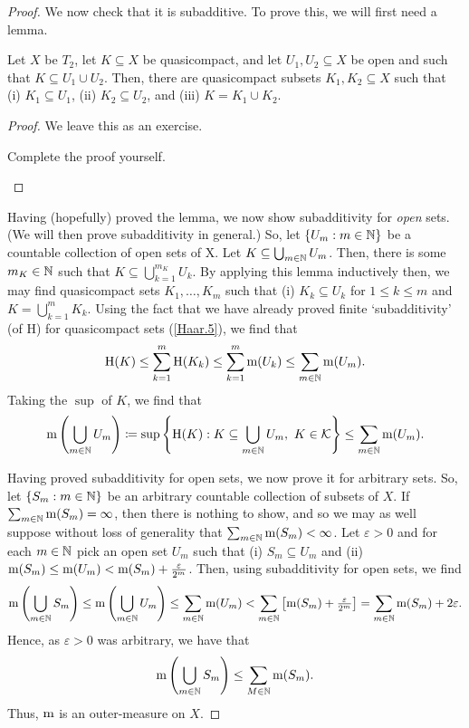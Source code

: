 \begin{thm}
\begin{savenotes}
\begin{proof}
We now check that it is subadditive.  To prove this, we will first need a lemma.
\begin{lma}
Let $X$ be $T_2$, let $K\subseteq X$ be quasicompact, and let $U_1,U_2\subseteq X$ be open and such that $K\subseteq U_1\cup U_2$.  Then, there are quasicompact subsets $K_1,K_2\subseteq X$ such that (i) $K_1\subseteq U_1$, (ii) $K_2\subseteq U_2$, and (iii) $K=K_1\cup K_2$.
\begin{proof}
We leave this as an exercise.
\begin{exr}
Complete the proof yourself.
\end{exr}
\end{proof}
\end{lma}
Having (hopefully) proved the lemma, we now show subadditivity for \emph{open} sets.  (We will then prove subadditivity in general.)  So, let $\{ U_m:m\in \mathbb{N} \}$ be a countable collection of open sets of X.  Let $K\subseteq \bigcup _{m\in \mathbb{N}}U_m$.  Then, there is some $m_K\in \mathbb{N}$ such that $K\subseteq \bigcup _{k=1}^{m_K}U_k$.  By applying this lemma inductively then, we may find quasicompact sets $K_1,\ldots ,K_m$ such that (i) $K_k\subseteq U_k$ for $1\leq k\leq m$ and $K=\bigcup _{k=1}^mK_k$.  Using the fact that we have already proved finite `subadditivity' (of $\mathrm{H}$) for quasicompact sets (\cref{Haar.5}), we find that
\begin{equation}
\mathrm{H}(K)\leq \sum _{k=1}^m\mathrm{H}(K_k)\leq \sum _{k=1}^m\mathrm{m} (U_k)\leq \sum _{m\in \mathbb{N}}\mathrm{m} (U_m).
\end{equation}
Taking the $\sup$ of $K$, we find that
\begin{equation}
\mathrm{m} \left( \bigcup _{m\in \mathbb{N}}U_m\right) \coloneqq \sup \left\{ \mathrm{H}(K):K\subseteq \bigcup _{m\in \mathbb{N}}U_m,\ K\in \mathcal{K}\right\} \leq \sum _{m\in \mathbb{N}}\mathrm{m} (U_m).
\end{equation}

Having proved subadditivity for open sets, we now prove it for arbitrary sets.  So, let $\{ S_m:m\in \mathbb{N} \}$ be an arbitrary countable collection of subsets of $X$.  If $\sum _{m\in \mathbb{N}}\mathrm{m} (S_m)=\infty$, then there is nothing to show, and so we may as well suppose without loss of generality that $\sum _{m\in \mathbb{N}}\mathrm{m} (S_m)<\infty$.  Let $\varepsilon >0$ and for each $m\in \mathbb{N}$ pick an open set $U_m$ such that (i) $S_m\subseteq U_m$ and (ii) $\mathrm{m} (S_m)\leq \mathrm{m} (U_m)<\mathrm{m} (S_m)+\frac{\varepsilon}{2^m}$.  Then, using subadditivity for open sets, we find
\begin{equation}
\mathrm{m} \left( \bigcup _{m\in \mathbb{N}}S_m\right) \leq \mathrm{m} \left( \bigcup _{m\in \mathbb{N}}U_m\right) \leq \sum _{m\in \mathbb{N}}\mathrm{m} (U_m)<\sum _{m\in \mathbb{N}}\left[ \mathrm{m} (S_m)+\tfrac{\varepsilon}{2^m}\right] =\sum _{m\in \mathbb{N}}\mathrm{m} (S_m)+2\varepsilon .
\end{equation}
Hence, as $\varepsilon >0$ was arbitrary, we have that
\begin{equation}
\mathrm{m} \left( \bigcup _{m\in \mathbb{N}}S_m\right) \leq \sum _{M\in \mathbb{N}}\mathrm{m} (S_m).
\end{equation}
Thus, $\mathrm{m}$ is an outer-measure on $X$.


\end{proof}
\end{savenotes}
\end{thm}
